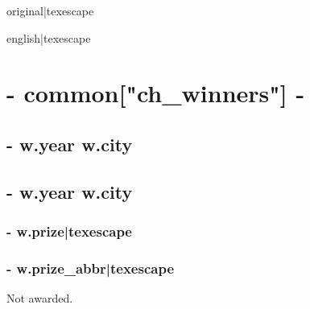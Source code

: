 {%

{%
{%
{{ original|texescape }} {%
{%
{ } \textbar{} {{ english|texescape }}
{%
 {%
{%
{%

{%
{%
{%
{%
{%
{%
{%
{%
{%
{%

{%
\chapter{ {{- common["ch_winners"] -}} }
{%
{%
    \section*{ {{- w.year }} {{ w.city }} }
{%
    \section*{ {{- w.year }} {{ w.city }} }
{%
{%
        {%
           \subsection*{ {{- w.prize|texescape }} }
        {%
            \subsection*{ {{- w.prize_abbr|texescape }} }
        {%
{%
{%
Not awarded.
{%
}}}}}}}}}}}}}}}}}}}}}}}}}}}}}}}
